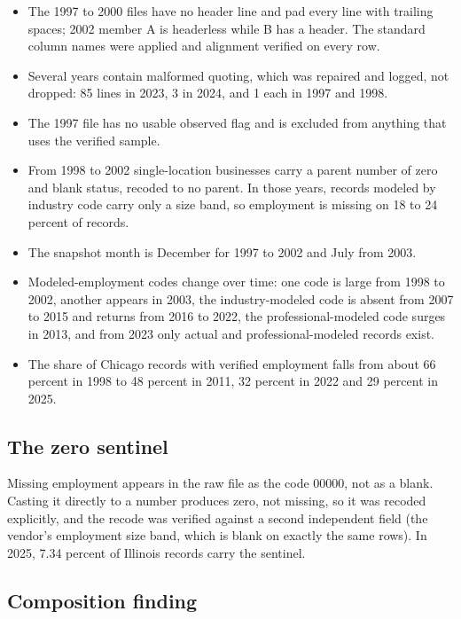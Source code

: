 \documentclass[12pt,letterpaper]{article}
\begin{document}
\begin{itemize}[leftmargin=*,itemsep=2pt]
\item The 1997 to 2000 files have no header line and pad every line with trailing spaces; 2002 member A is headerless while B has a header. The standard column names were applied and alignment verified on every row.
\item Several years contain malformed quoting, which was repaired and logged, not dropped: 85 lines in 2023, 3 in 2024, and 1 each in 1997 and 1998.
\item The 1997 file has no usable observed flag and is excluded from anything that uses the verified sample.
\item From 1998 to 2002 single-location businesses carry a parent number of zero and blank status, recoded to no parent. In those years, records modeled by industry code carry only a size band, so employment is missing on 18 to 24 percent of records.
\item The snapshot month is December for 1997 to 2002 and July from 2003.
\item Modeled-employment codes change over time: one code is large from 1998 to 2002, another appears in 2003, the industry-modeled code is absent from 2007 to 2015 and returns from 2016 to 2022, the professional-modeled code surges in 2013, and from 2023 only actual and professional-modeled records exist.
\item The share of Chicago records with verified employment falls from about 66 percent in 1998 to 48 percent in 2011, 32 percent in 2022 and 29 percent in 2025.
\end{itemize}

\subsection*{The zero sentinel}

Missing employment appears in the raw file as the code 00000, not as a blank. Casting it directly to a number produces zero, not missing, so it was recoded explicitly, and the recode was verified against a second independent field (the vendor's employment size band, which is blank on exactly the same rows). In 2025, 7.34 percent of Illinois records carry the sentinel.

\subsection*{Composition finding}
\end{document}
